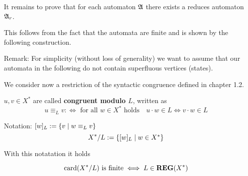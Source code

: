 It remains to prove that for each automaton $\mbox{$\mathfrak{A}$}$ there exists a reduces
automaton $\mbox{$\mathfrak{A}$}_r$.

This follows from the fact that the automata are finite and is shown by the
following construction.

Remark: For simplicity (without loss of generality) we want to assume that our
automata in the following do not contain superfluous vertices (states).

We consider now a restriction of the syntactic congruence defined in chapter
1.2.

\begin{definition}
$u, v \in X^*$ are called {\bf congruent modulo $L$}, written as 
\[ u \equiv_L v :\iff \mbox{ for all } w \in X^* \mbox{ holds}\quad u \cdot w
\in L \iff v \cdot w \in L \]
\end{definition}

Notation: $[w]_L := \mbox{$\{v \mid w \equiv_L v\}$}$
\[ X^*/L := \mbox{$\{[w]_L \mid w \in X^*\}$} \]

With this notatation it holds

\begin{lemma}
\[ \mathrm{card}({X^*/L}) \mbox{ is finite} \iff L \in \mbox{{\bf REG}}(X^*) \]
\end{lemma}

